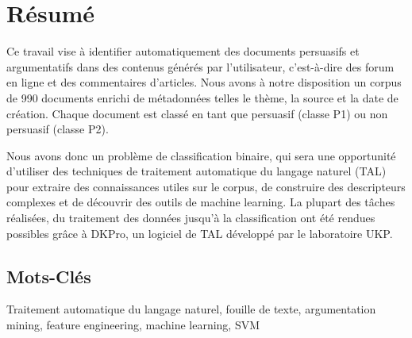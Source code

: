 \newpage
\section*{R\'esum\'e}
Ce travail vise \`a identifier automatiquement des documents persuasifs et argumentatifs dans des contenus g\'en\'er\'es par l'utilisateur, c'est-\`a-dire des forum en ligne et des commentaires d'articles. Nous avons \`a notre disposition un corpus de 990 documents enrichi de m\'etadonn\'ees telles le th\`eme, la source et la date de cr\'eation. Chaque document est class\'e en tant que persuasif (classe P1) ou non persuasif (classe P2).

Nous avons donc un probl\`eme de classification binaire, qui sera une opportunit\'e d'utiliser des techniques de traitement automatique du langage naturel (TAL) pour extraire des connaissances utiles sur le corpus, de construire des descripteurs complexes et de d\'ecouvrir des outils de machine learning. La plupart des t\^aches r\'ealis\'ees, du traitement des donn\'ees jusqu'\`a la classification ont \'et\'e rendues possibles gr\^ace \`a DKPro, un logiciel de TAL d\'evelopp\'e par le laboratoire UKP.

\subsection*{Mots-Cl\'es}

Traitement automatique du langage naturel, fouille de texte, argumentation mining, feature engineering, machine learning, SVM